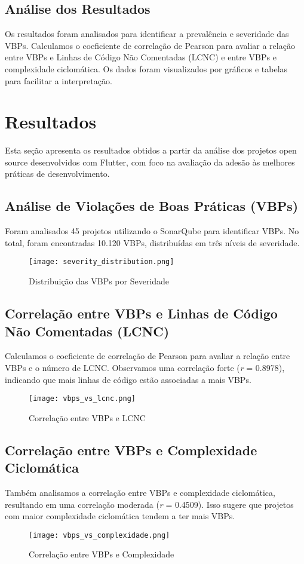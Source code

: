 \documentclass[12pt]{article}
\begin{document}
\subsection{Análise dos Resultados}
Os resultados foram analisados para identificar a prevalência e severidade das VBPs. Calculamos o coeficiente de correlação de Pearson para avaliar a relação entre VBPs e Linhas de Código Não Comentadas (LCNC) e entre VBPs e complexidade ciclomática. Os dados foram visualizados por gráficos e tabelas para facilitar a interpretação.

\section{Resultados}

Esta seção apresenta os resultados obtidos a partir da análise dos projetos open source desenvolvidos com Flutter, com foco na avaliação da adesão às melhores práticas de desenvolvimento.

\subsection{Análise de Violações de Boas Práticas (VBPs)}
Foram analisados 45 projetos utilizando o SonarQube para identificar VBPs. No total, foram encontradas 10.120 VBPs, distribuídas em três níveis de severidade.

\begin{figure}[H]
\centering
\texttt{[image: severity\_distribution.png]}
\caption{Distribuição das VBPs por Severidade}
\label{fig:vbps_severity_distribution}
\end{figure}

\subsection{Correlação entre VBPs e Linhas de Código Não Comentadas (LCNC)}
Calculamos o coeficiente de correlação de Pearson para avaliar a relação entre VBPs e o número de LCNC. Observamos uma correlação forte (\textit{r} = 0.8978), indicando que mais linhas de código estão associadas a mais VBPs.

\begin{figure}[H]
\centering
\texttt{[image: vbps\_vs\_lcnc.png]}
\caption{Correlação entre VBPs e LCNC}
\label{fig:vbps_vs_lcnc}
\end{figure}

\subsection{Correlação entre VBPs e Complexidade Ciclomática}
Também analisamos a correlação entre VBPs e complexidade ciclomática, resultando em uma correlação moderada (\textit{r} = 0.4509). Isso sugere que projetos com maior complexidade ciclomática tendem a ter mais VBPs.
\begin{figure}[H]
\centering
\texttt{[image: vbps\_vs\_complexidade.png]}
\caption{Correlação entre VBPs e Complexidade}
\label{fig:vbps_vs_complexidade}
\end{figure}
\end{document}
